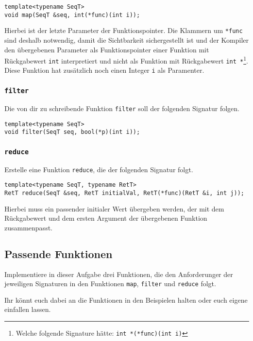 \begin{lstlisting}
template<typename SeqT>
void map(SeqT &seq, int(*func)(int i));
\end{lstlisting}

Hierbei ist der letzte Parameter der Funktionspointer.
Die Klammern um \lstinline{*func} sind deshalb notwendig, damit die Sichtbarkeit sichergestellt ist und der Kompiler den übergebenen Parameter als Funktionspointer einer Funktion mit Rückgabewert \lstinline{int} interpretiert und nicht als Funktion mit Rückgabewert \lstinline{int *}\footnote{Welche folgende Signature hätte: \lstinline{int *(*func)(int i)}}.
Diese Funktion hat zusätzlich noch einen Integer \lstinline{i} als Paramenter.

\subsubsection{\lstinline{filter}}

Die von dir zu schreibende Funktion \lstinline{filter} soll der folgenden Signatur folgen.

\begin{lstlisting}
template<typename SeqT>
void filter(SeqT seq, bool(*p)(int i));
\end{lstlisting}

\subsubsection{\lstinline{reduce}}

Erstelle eine Funktion \lstinline{reduce}, die der folgenden Signatur folgt.

\begin{lstlisting}
template<typename SeqT, typename RetT>
RetT reduce(SeqT &seq, RetT initialVal, RetT(*func)(RetT &i, int j));
\end{lstlisting}

Hierbei muss ein passender initialer Wert übergeben werden, der mit dem Rückgabewert und dem ersten Argument der übergebenen Funktion zusammenpasst.

\subsection{Passende Funktionen}
Implementiere in dieser Aufgabe drei Funktionen, die den Anforderunger der jeweiligen Signaturen in den Funktionen \lstinline{map}, \lstinline{filter} und \lstinline{reduce} folgt.

Ihr könnt euch dabei an die Funktionen in den Beispielen halten oder euch eigene einfallen lassen.
